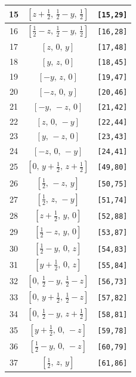 \documentclass[fleqn,8pt]{jsarticle}
\begin{document}
\begin{longtable}{ccc}
15 & $\left[ z + \frac{1}{2},\, \frac{1}{2} - y,\, \frac{1}{2} \right]$ & {\tt [15,29]} \\ \hline
16 & $\left[ \frac{1}{2} - z,\, \frac{1}{2} - y,\, \frac{1}{2} \right]$ & {\tt [16,28]} \\ \hline
17 & $\left[ z,\, 0,\, y \right]$ & {\tt [17,48]} \\ \hline
18 & $\left[ y,\, z,\, 0 \right]$ & {\tt [18,45]} \\ \hline
19 & $\left[ - y,\, z,\, 0 \right]$ & {\tt [19,47]} \\ \hline
20 & $\left[ - z,\, 0,\, y \right]$ & {\tt [20,46]} \\ \hline
21 & $\left[ - y,\, - z,\, 0 \right]$ & {\tt [21,42]} \\ \hline
22 & $\left[ z,\, 0,\, - y \right]$ & {\tt [22,44]} \\ \hline
23 & $\left[ y,\, - z,\, 0 \right]$ & {\tt [23,43]} \\ \hline
24 & $\left[ - z,\, 0,\, - y \right]$ & {\tt [24,41]} \\ \hline
25 & $\left[ 0,\, y + \frac{1}{2},\, z + \frac{1}{2} \right]$ & {\tt [49,80]} \\ \hline
26 & $\left[ \frac{1}{2},\, - z,\, y \right]$ & {\tt [50,75]} \\ \hline
27 & $\left[ \frac{1}{2},\, z,\, - y \right]$ & {\tt [51,74]} \\ \hline
28 & $\left[ z + \frac{1}{2},\, y,\, 0 \right]$ & {\tt [52,88]} \\ \hline
29 & $\left[ \frac{1}{2} - z,\, y,\, 0 \right]$ & {\tt [53,87]} \\ \hline
30 & $\left[ \frac{1}{2} - y,\, 0,\, z \right]$ & {\tt [54,83]} \\ \hline
31 & $\left[ y + \frac{1}{2},\, 0,\, z \right]$ & {\tt [55,84]} \\ \hline
32 & $\left[ 0,\, \frac{1}{2} - y,\, \frac{1}{2} - z \right]$ & {\tt [56,73]} \\ \hline
33 & $\left[ 0,\, y + \frac{1}{2},\, \frac{1}{2} - z \right]$ & {\tt [57,82]} \\ \hline
34 & $\left[ 0,\, \frac{1}{2} - y,\, z + \frac{1}{2} \right]$ & {\tt [58,81]} \\ \hline
35 & $\left[ y + \frac{1}{2},\, 0,\, - z \right]$ & {\tt [59,78]} \\ \hline
36 & $\left[ \frac{1}{2} - y,\, 0,\, - z \right]$ & {\tt [60,79]} \\ \hline
37 & $\left[ \frac{1}{2},\, z,\, y \right]$ & {\tt [61,86]} \\ \hline

\end{longtable}
\end{document}
